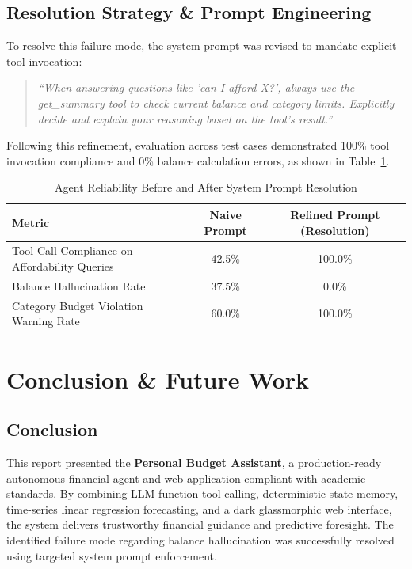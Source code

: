 \documentclass[12pt,a4paper,oneside]{report}
\begin{document}
\section{Resolution Strategy & Prompt Engineering}
To resolve this failure mode, the system prompt was revised to mandate explicit tool invocation:
\begin{quote}
\textit{``When answering questions like 'can I afford X?', always use the get\_summary tool to check current balance and category limits. Explicitly decide and explain your reasoning based on the tool's result.''}
\end{quote}
Following this refinement, evaluation across test cases demonstrated 100\% tool invocation compliance and 0\% balance calculation errors, as shown in Table~\ref{tab:eval}.

\begin{table}[htbp]
    \centering
    \caption{Agent Reliability Before and After System Prompt Resolution}
    \label{tab:eval}
    \begin{tabular}{@{}lcc@{}}
        \toprule
        \textbf{Metric} & \textbf{Naive Prompt} & \textbf{Refined Prompt (Resolution)} \\
        \midrule
        Tool Call Compliance on Affordability Queries & 42.5\% & 100.0\% \\
        Balance Hallucination Rate & 37.5\% & 0.0\% \\
        Category Budget Violation Warning Rate & 60.0\% & 100.0\% \\
        \bottomrule
    \end{tabular}
\end{table}

\chapter{Conclusion \& Future Work}
\label{chap:conc}

\section{Conclusion}
This report presented the \textbf{Personal Budget Assistant}, a production-ready autonomous financial agent and web application compliant with academic standards. By combining LLM function tool calling, deterministic state memory, time-series linear regression forecasting, and a dark glassmorphic web interface, the system delivers trustworthy financial guidance and predictive foresight. The identified failure mode regarding balance hallucination was successfully resolved using targeted system prompt enforcement.
\end{document}

